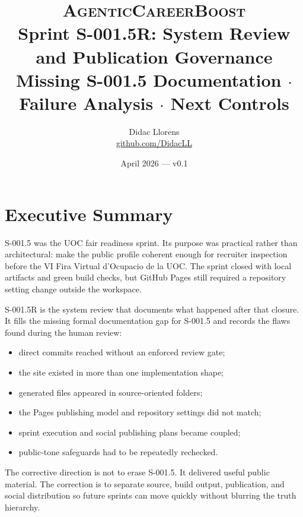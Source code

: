 \documentclass[a4paper,11pt,openany]{report}
\title{%
  \textsc{AgenticCareerBoost}\\[0.4em]
  \Large Sprint S-001.5R: System Review and Publication Governance\\[0.3em]
  \large Missing S-001.5 Documentation $\cdot$ Failure Analysis $\cdot$ Next Controls%
}
\author{Didac Llorens \\ \small \href{https://github.com/DidacLL}{github.com/DidacLL}}
\date{April 2026 --- v0.1}
\begin{document}
\maketitle
\tableofcontents
\newpage

\chapter{Executive Summary}
\label{ch:executive}


S-001.5 was the UOC fair readiness sprint. Its purpose was practical rather
than architectural: make the public profile coherent enough for recruiter
inspection before the VI Fira Virtual d'Ocupacio de la UOC. The sprint closed
with local artifacts and green build checks, but GitHub Pages still required a
repository setting change outside the workspace.

S-001.5R is the system review that documents what happened after that closure.
It fills the missing formal documentation gap for S-001.5 and records the
flaws found during the human review:

\begin{itemize}
  \item direct commits reached  without an enforced review gate;
  \item the site existed in more than one implementation shape;
  \item generated files appeared in source-oriented folders;
  \item the Pages publishing model and repository settings did not match;
  \item sprint execution and social publishing plans became coupled;
  \item public-tone safeguards had to be repeatedly rechecked.
\end{itemize}

The corrective direction is not to erase S-001.5. It delivered useful public
material. The correction is to separate source, build output, publication, and
social distribution so future sprints can move quickly without blurring the
truth hierarchy.
\end{document}
